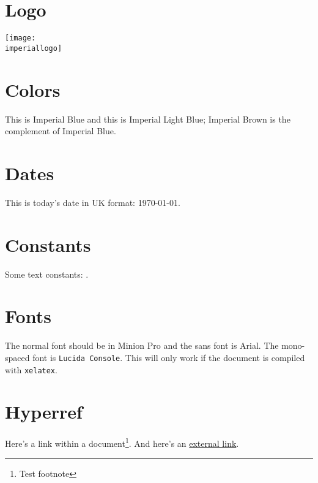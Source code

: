 \documentclass[a4paper]{article}
\begin{document}
\section*{Logo}

\texttt{[image: \\imperiallogo]}

\section*{Colors}
This is \textcolor{ImperialBlue}{Imperial Blue} and this is \textcolor{ImperialLightBlue}{Imperial Light Blue}; \textcolor{ImperialBrown}{Imperial Brown} is the complement of Imperial Blue.

\section*{Dates}
This is today's date in UK format: \today.

\section*{Constants}
Some text constants: \college.

\section*{Fonts}
The normal font should be in Minion Pro and \textsf{the sans font is Arial}.  The mono-spaced font is \texttt{Lucida Console}.  This will only work if the document is compiled with \texttt{xelatex}.

\section*{Hyperref}
Here's a link within a document\footnote{Test footnote}.  And here's an \href{http://www.guardian.co.uk}{external link}.
\end{document}
